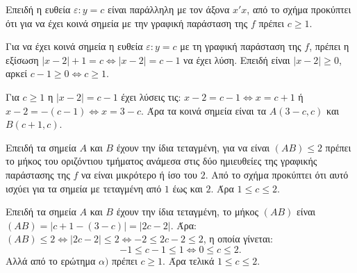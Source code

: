 
\begin{alist}
\item 
\begin{rlist}
\item Επειδή η ευθεία $\varepsilon: y = c$ είναι παράλληλη με τον άξονα $x'x$, από το σχήμα προκύπτει
ότι για να έχει κοινά σημεία με την γραφική παράσταση της $f$ πρέπει $c \ge 1$.
\item Για να έχει κοινά σημεία η ευθεία $\varepsilon: y = c$ με τη γραφική παράσταση της $f$, πρέπει η εξίσωση $|x - 2| + 1 = c \Leftrightarrow |x - 2| = c - 1$ να έχει λύση. Επειδή είναι $|x - 2| \ge 0$, αρκεί $c - 1 \ge 0 \Leftrightarrow c \ge 1$.
\end{rlist}

\item Για $c \ge 1$ η $|x - 2| = c - 1$ έχει λύσεις τις:
$x - 2 = c - 1 \Leftrightarrow x = c + 1$ ή $x - 2 = -(c - 1) \Leftrightarrow x = 3 - c$.
Άρα τα κοινά σημεία είναι τα $A(3 - c, c)$ και $B(c + 1, c)$.

\item 
\begin{rlist}
\item Επειδή τα σημεία $A$ και $B$ έχουν την ίδια τεταγμένη, για να είναι $(AB) \le 2$ πρέπει το μήκος του οριζόντιου τμήματος ανάμεσα στις δύο ημιευθείες της γραφικής παράστασης της $f$ να είναι μικρότερο ή ίσο του $2$. Από το σχήμα προκύπτει ότι αυτό ισχύει για τα σημεία με τεταγμένη από $1$ έως και $2$. Άρα $1 \le c \le 2$.
\item Επειδή τα σημεία $A$ και $B$ έχουν την ίδια τεταγμένη, το μήκος $(AB)$ είναι
$(AB) = |c + 1 - (3 - c)| = |2c - 2|$. Άρα:
$(AB) \le 2 \Leftrightarrow |2c - 2| \le 2 \Leftrightarrow -2 \le 2c - 2 \le 2$, η οποία γίνεται:
\[-1 \le c - 1 \le 1 \Leftrightarrow 0 \le c \le 2.\]
Αλλά από το ερώτημα $\alpha)$ πρέπει $c \ge 1$. Άρα τελικά $1 \le c \le 2$.
\end{rlist}
\end{alist}


